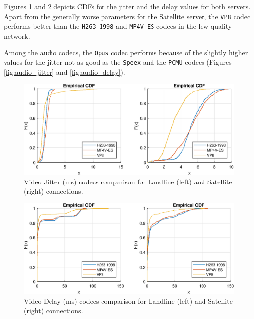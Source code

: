 \documentclass[parskip=full]{scrartcl}
\begin{document}
Figures \ref{fig:video_jitter} and \ref{fig:video_delay} depicts CDFs for the jitter and the delay values for both servers. Apart from the generally worse parameters for the Satellite server, the \texttt{VP8} codec performs better than the \texttt{H263-1998} and \texttt{MP4V-ES} codecs in the low quality network. 

Among the audio codecs, the \texttt{Opus} codec performs because of the slightly higher values for the jitter not as good as the \texttt{Speex} and the \texttt{PCMU} codecs (Figures \ref{fig:audio_jitter} and \ref{fig:audio_delay}).

\begin{figure}
    \centering
    \includegraphics[width=1\textwidth]{results/Video_Codecs_Satellite_Jitter.eps} 
    \caption{Video Jitter (ms) codecs comparison for Landline (left) and Satellite (right) connections. }
    \label{fig:video_jitter}
\end{figure}

\begin{figure}
    \centering
    \includegraphics[width=1\textwidth]{results/Video_Codecs_Satellite_Delay.eps} 
    \caption{Video Delay (ms) codecs comparison for Landline (left) and Satellite (right) connections. }
    \label{fig:video_delay}
\end{figure}
\end{document}
